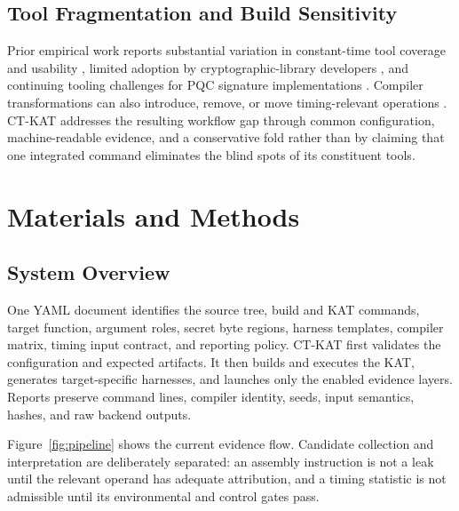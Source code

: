 \documentclass[cryptography,article,submit,moreauthors]{Definitions/mdpi}
\begin{document}
\subsection{Tool Fragmentation and Build Sensitivity}

Prior empirical work reports substantial variation in constant-time tool
coverage and usability \citep{geimer2023systematic}, limited adoption by
cryptographic-library developers \citep{jancar2022they}, and continuing
tooling challenges for PQC signature implementations
\citep{adjonyo2025systematic}. Compiler transformations can also introduce,
remove, or move timing-relevant operations \citep{simon2018you}. CT-KAT
addresses the resulting workflow gap through common configuration,
machine-readable evidence, and a conservative fold rather than by claiming
that one integrated command eliminates the blind spots of its constituent
tools.

\section{Materials and Methods}
\label{sec:methods}

\subsection{System Overview}

One YAML document identifies the source tree, build and KAT commands, target
function, argument roles, secret byte regions, harness templates, compiler
matrix, timing input contract, and reporting policy. CT-KAT first validates
the configuration and expected artifacts. It then builds and executes the KAT,
generates target-specific harnesses, and launches only the enabled evidence
layers. Reports preserve command lines, compiler identity, seeds, input
semantics, hashes, and raw backend outputs.

Figure~\ref{fig:pipeline} shows the current evidence flow. Candidate collection
and interpretation are deliberately separated: an assembly instruction is not
a leak until the relevant operand has adequate attribution, and a timing
statistic is not admissible until its environmental and control gates pass.
\end{document}
